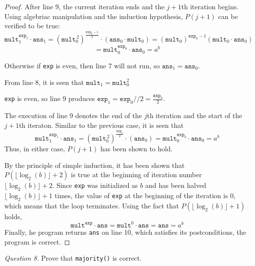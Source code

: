 \documentclass[11pt]{article}
\begin{document}
\begin{enumerate}[label=(\alph*)]
\begin{proof}
            After line 9, the current iteration ends and the \(j+1\)th iteration begins. Using algebriac manipulation and the induction hypothesis, \(P(j+1)\) can be verified to be true:
            \[
                \texttt{mult}_1^{\texttt{exp}_1} \cdot \texttt{ans}_1 = (\texttt{mult}_0^{\, 2})^\frac{\texttt{exp}_0 - 1}{2} \cdot (\texttt{ans}_0 \cdot \texttt{mult}_0) = (\texttt{mult}_0)^{\texttt{exp}_0 - 1}(\texttt{mult}_0 \cdot \texttt{ans}_0)
            \]
            \[
                = \texttt{mult}_0 ^{\texttt{exp}_0} \cdot \texttt{ans}_0 = a^b
            \]

            Otherwise if \verb|exp| is even, then line 7 will not run, so \(\texttt{ans}_1 = \texttt{ans}_0\).

            From line 8, it is seen that \(\texttt{mult}_1 = \texttt{mult}_0^2\)

            \verb|exp| is even, so line 9 produces \(\texttt{exp}_1 = \texttt{exp}_0 // 2 = \frac{\texttt{exp}_0}{2}\).

            The execution of line 9 denotes the end of the \(j\)th iteration and the start of the \(j+1\)th iteraton. Similar to the previous case, it is seen that 
            \[
                \texttt{mult}_1^{\texttt{exp}_1} \cdot \texttt{ans}_1 = (\texttt{mult}_0^{\, 2})^\frac{\texttt{exp}_0}{2} \cdot (\texttt{ans}_0) = \texttt{mult}_0^{\texttt{exp}_0} \cdot \texttt{ans}_0 = a^b
            \]
            Thus, in either case, \(P(j+1)\) has been shown to hold.

            By the principle of simple induction, it has been shown that \(P(\lfloor \log _2(b) \rfloor + 2)\) is true at the beginning of iteration number \(\lfloor \log _2(b) \rfloor + 2\). Since \verb|exp| was initialized as \(b\) and has been halved \(\lfloor \log _2(b) \rfloor + 1\) times, the value of \verb|exp| at the beginning of the iteration is 0, which means that the loop terminates. Using the fact that \(P(\lfloor \log _2(b) \rfloor + 1)\) holds,
            \[
                \texttt{mult}^\texttt{exp} \cdot \texttt{ans} = \texttt{mult}^0 \cdot \texttt{ans} = \texttt{ans} = a^b
            \]
            Finally, he program returns \verb|ans| on line 10, which satisfies its postconditions, the program is correct.

        \end{proof}
    \end{enumerate}
    \textit{Question 8.} Prove that \verb|majority()| is correct.
\end{document}
